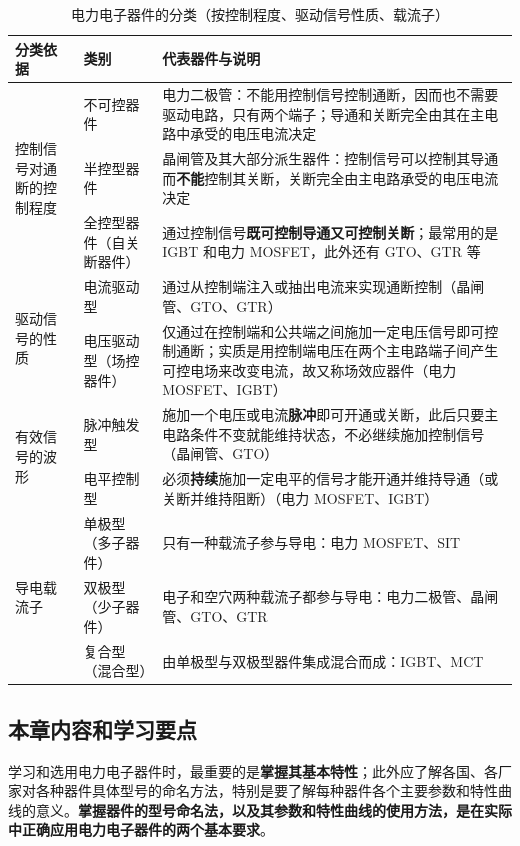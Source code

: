 \begin{table}[htbp]
\centering
\caption{电力电子器件的分类（按控制程度、驱动信号性质、载流子）}
\label{tab:2-1}
\begin{tabular}{p{2.7cm}p{4.8cm}p{6.5cm}}
\toprule
\textbf{分类依据} & \textbf{类别} & \textbf{代表器件与说明} \\
\midrule
\multirow{3}{2.4cm}{控制信号对通断的控制程度} & 不可控器件 & 电力二极管：不能用控制信号控制通断，因而也不需要驱动电路，只有两个端子；导通和关断完全由其在主电路中承受的电压电流决定 \\
 & 半控型器件 & 晶闸管及其大部分派生器件：控制信号可以控制其导通而\textbf{不能}控制其关断，关断完全由主电路承受的电压电流决定 \\
 & 全控型器件（自关断器件） & 通过控制信号\textbf{既可控制导通又可控制关断}；最常用的是 IGBT 和电力 MOSFET，此外还有 GTO、GTR 等 \\
\midrule
\multirow{2}{2.4cm}{驱动信号的性质} & 电流驱动型 & 通过从控制端注入或抽出电流来实现通断控制（晶闸管、GTO、GTR） \\
 & 电压驱动型（场控器件） & 仅通过在控制端和公共端之间施加一定电压信号即可控制通断；实质是用控制端电压在两个主电路端子间产生可控电场来改变电流，故又称场效应器件（电力 MOSFET、IGBT） \\
\midrule
\multirow{2}{2.4cm}{有效信号的波形} & 脉冲触发型 & 施加一个电压或电流\textbf{脉冲}即可开通或关断，此后只要主电路条件不变就能维持状态，不必继续施加控制信号（晶闸管、GTO） \\
 & 电平控制型 & 必须\textbf{持续}施加一定电平的信号才能开通并维持导通（或关断并维持阻断）（电力 MOSFET、IGBT） \\
\midrule
\multirow{3}{2.4cm}{导电载流子} & 单极型（多子器件） & 只有一种载流子参与导电：电力 MOSFET、SIT \\
 & 双极型（少子器件） & 电子和空穴两种载流子都参与导电：电力二极管、晶闸管、GTO、GTR \\
 & 复合型（混合型） & 由单极型与双极型器件集成混合而成：IGBT、MCT \\
\bottomrule
\end{tabular}
\end{table}

\subsection{本章内容和学习要点}

学习和选用电力电子器件时，最重要的是\textbf{掌握其基本特性}；此外应了解各国、各厂家对各种器件具体型号的命名方法，特别是要了解每种器件各个主要参数和特性曲线的意义。\textbf{掌握器件的型号命名法，以及其参数和特性曲线的使用方法，是在实际中正确应用电力电子器件的两个基本要求}。

